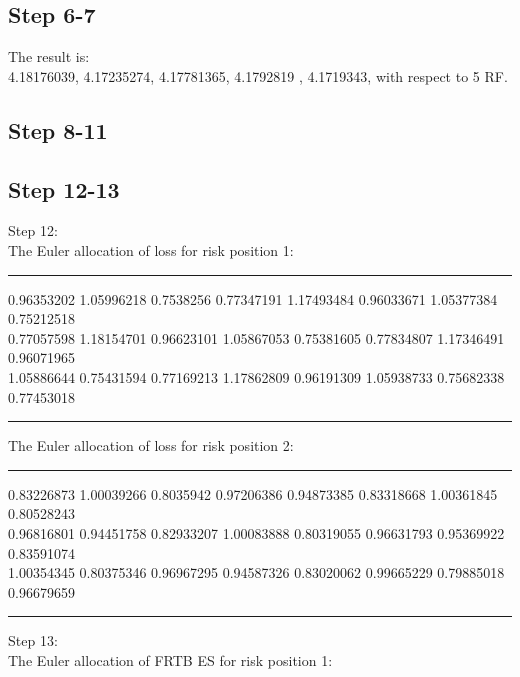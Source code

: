 \documentclass{article}
\begin{document}
\subsection*{Step 6-7}
The result is:\\
4.18176039, 4.17235274, 4.17781365, 4.1792819 , 4.1719343, with respect to 5 RF.

\subsection*{Step 8-11}
\subsection*{Step 12-13}
Step 12:\\
The Euler allocation of loss for risk position 1:\\
\hrule \vspace{5pt}
 0.96353202 1.05996218 0.7538256  0.77347191
 1.17493484 0.96033671 1.05377384 0.75212518\\ 0.77057598
 1.18154701 0.96623101 1.05867053 0.75381605 0.77834807
 1.17346491 0.96071965\\ 1.05886644 0.75431594 0.77169213
 1.17862809 0.96191309 1.05938733 0.75682338 0.77453018 \\
\hrule \vspace{5pt}
\noindent The Euler allocation of loss for risk position 2:\\
\hrule \vspace{5pt}
 0.83226873 1.00039266 0.8035942  0.97206386
 0.94873385 0.83318668 1.00361845 0.80528243\\ 0.96816801
 0.94451758 0.82933207 1.00083888 0.80319055 0.96631793
 0.95369922 0.83591074\\ 1.00354345 0.80375346 0.96967295
 0.94587326 0.83020062 0.99665229 0.79885018 0.96679659 \\
\hrule \vspace{5pt}
\vspace{15pt}
\noindent Step 13:\\
The Euler allocation of FRTB ES for risk position 1:
\begin{table}[H]
\centering
  \label{tab:my-tab1}
  \end{table}
\end{document}
